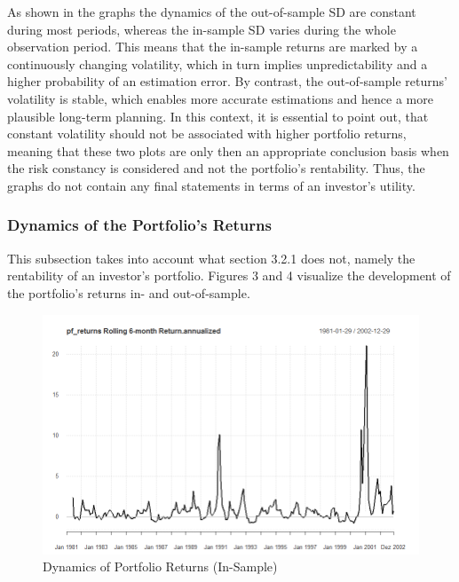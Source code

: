 \documentclass{article}
\begin{document}
As shown in the graphs the dynamics of the out-of-sample SD are constant during most periods, whereas the in-sample SD varies during the whole observation period. This means that the in-sample returns are marked by a continuously changing volatility, which in turn implies unpredictability and a higher probability of an estimation error. By contrast, the out-of-sample returns' volatility is stable, which enables more accurate estimations and hence a more plausible long-term planning. In this context, it is essential to point out, that constant volatility should not be associated with higher portfolio returns, meaning that these two plots are only then an appropriate conclusion basis when the risk constancy is considered and not the portfolio's rentability. Thus, the graphs do not contain any final statements in terms of an investor's utility.  
\subsubsection{Dynamics of the Portfolio's Returns}
This subsection takes into account what section 3.2.1 does not, namely the rentability of an investor's portfolio. Figures 3 and 4 visualize the development of the portfolio's returns in- and out-of-sample.
\begin {figure}[htb]
    \begin{center}
    \includegraphics[scale=0.4]{portfolio_returns_dynamics_adjusted_in_sample.PNG}
    \caption{Dynamics of Portfolio Returns (In-Sample)}
    \end{center}
\end{figure}
\end{document}
